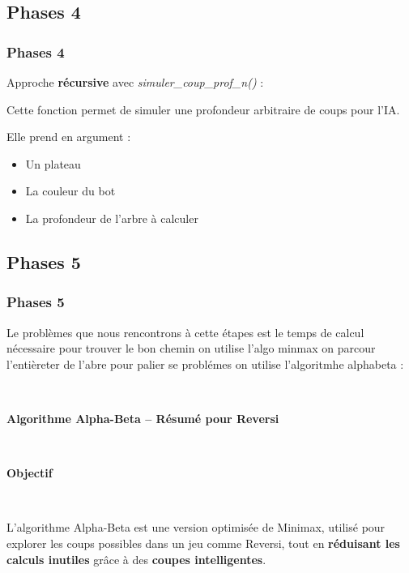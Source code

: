 \documentclass[9pt]{beamer}
\begin{document}
\subsection{Phases 4}
\begin{frame}
  \frametitle{Phases 4}
  Approche \textbf{récursive} avec \textit{simuler\_coup\_prof\_n()} :

  Cette fonction permet de simuler une profondeur arbitraire de coups pour l’IA.

  Elle prend en argument :
  \begin{itemize}
    \item Un plateau
    \item La couleur du bot
    \item La profondeur de l’arbre à calculer
  \end{itemize}
\end{frame}

\subsection{Phases 5}
\begin{frame}
  \frametitle{Phases 5}
  Le problèmes que nous rencontrons à cette étapes est le temps de calcul nécessaire pour trouver le bon chemin on utilise l'algo minmax on parcour l'entièreter de l'abre pour palier se problémes on utilise l'algoritmhe alphabeta :

  ~

\textbf{Algorithme Alpha-Beta – Résumé pour Reversi}

~

\textbf{Objectif}

~

L’algorithme Alpha-Beta est une version optimisée de Minimax, utilisé pour explorer les coups possibles dans un jeu comme Reversi, tout en \textbf{réduisant les calculs inutiles} grâce à des \textbf{coupes intelligentes}.
\end{frame}
\end{document}
